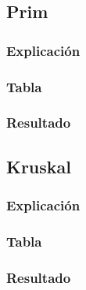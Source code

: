 \documentclass[12pt]{article}
\begin{document}
    \subsection{Prim}

      \subsubsection{Explicación}

      \subsubsection{Tabla}

      \subsubsection{Resultado}

    \subsection{Kruskal}

      \subsubsection{Explicación}

      \subsubsection{Tabla}

      \subsubsection{Resultado}
\end{document}
